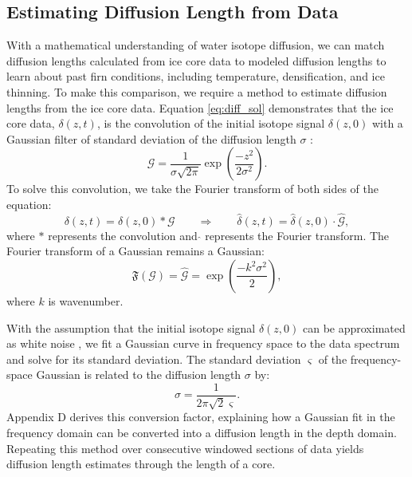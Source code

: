 \documentclass[draft, jgrga]{AGUTeX}
\begin{document}
\begin{article}

\section{Estimating Diffusion Length from Data}

With a mathematical understanding of water isotope diffusion, we can match diffusion lengths calculated from ice core data to modeled diffusion lengths to learn about past firn conditions, including temperature, densification, and ice thinning. To make this comparison, we require a method to estimate diffusion lengths from the ice core data. Equation \ref{eq:diff_sol} demonstrates that the ice core data, $\delta(z,t)$, is the convolution of the initial isotope signal $\delta(z,0)$ with a Gaussian filter of standard deviation of the diffusion length $\sigma$ \citep{Johnsen2000}:
\begin{equation}
\mathcal{G} = \frac{1}{\sigma \sqrt{2\pi}} \exp \left( \frac{-z^2}{2\sigma^2} \right).
\end{equation}
To solve this convolution, we take the Fourier transform of both sides of the equation:
\begin{equation}
  \delta(z,t) = \delta(z,0)*\mathcal{G} \qquad \Rightarrow \qquad \hat{\delta}(z,t) = \hat{\delta}(z,0) \cdot \hat{\mathcal{G}},
\end{equation}
where $*$ represents the convolution and \quad $\hat{}$ \quad represents the Fourier transform. The Fourier transform of a Gaussian remains a Gaussian:
\begin{equation}
\mathfrak{F}(\mathcal{G}) = \hat{\mathcal{G}} = \exp \left( \frac{-k^2\sigma^2}{2} \right),
\end{equation}
where $k$ is wavenumber.

With the assumption that the initial isotope signal $\delta(z,0)$ can be approximated as white noise \citep{Gkinis2014}, we fit a Gaussian curve in frequency space to the data spectrum and solve for its standard deviation. The standard deviation $\varsigma$ of the frequency-space Gaussian is related to the diffusion length $\sigma$ by:
\begin{equation}
  \sigma = \frac{1}{2\pi\sqrt{2}\varsigma}.
\end{equation}
Appendix D derives this conversion factor, explaining how a Gaussian fit in the frequency domain can be converted into a diffusion length in the depth domain. Repeating this method over consecutive windowed sections of data yields diffusion length estimates through the length of a core.


\end{article}
\end{document}
